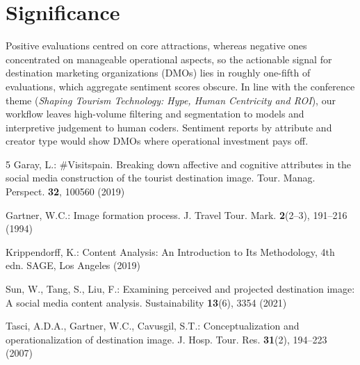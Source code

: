 \documentclass[runningheads]{llncs}
\begin{document}
\section{Significance}
Positive evaluations centred on core attractions, whereas negative ones concentrated on manageable operational aspects, so the actionable signal for destination marketing organizations (DMOs) lies in roughly one-fifth of evaluations, which aggregate sentiment scores obscure. In line with the conference theme (\emph{Shaping Tourism Technology: Hype, Human Centricity and ROI}), our workflow leaves high-volume filtering and segmentation to models and interpretive judgement to human coders. Sentiment reports by attribute and creator type would show DMOs where operational investment pays off.

\begin{thebibliography}{5}
Garay, L.: \#Visitspain. Breaking down affective and cognitive attributes in the social media construction of the tourist destination image. Tour. Manag. Perspect. \textbf{32}, 100560 (2019)

Gartner, W.C.: Image formation process. J. Travel Tour. Mark. \textbf{2}(2--3), 191--216 (1994)

Krippendorff, K.: Content Analysis: An Introduction to Its Methodology, 4th edn. SAGE, Los Angeles (2019)

Sun, W., Tang, S., Liu, F.: Examining perceived and projected destination image: A social media content analysis. Sustainability \textbf{13}(6), 3354 (2021)

Tasci, A.D.A., Gartner, W.C., Cavusgil, S.T.: Conceptualization and operationalization of destination image. J. Hosp. Tour. Res. \textbf{31}(2), 194--223 (2007)
\end{thebibliography}
\end{document}
